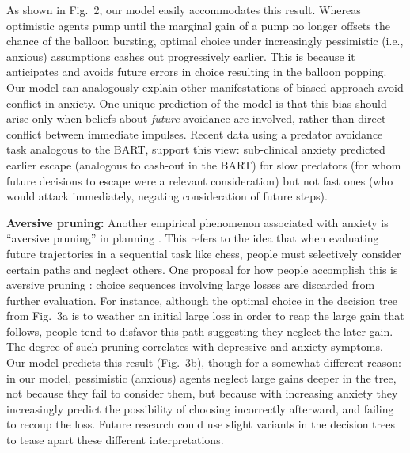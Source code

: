 \documentclass[11pt]{article} %
\begin{document}
As shown in Fig.~2, our model easily accommodates this result. Whereas optimistic agents pump until the marginal gain of a pump no longer offsets the chance of the balloon bursting, optimal choice under increasingly pessimistic (i.e., anxious) assumptions cashes out progressively earlier. This is because it anticipates and avoids future errors in choice resulting in the balloon popping. Our model can analogously explain other manifestations of biased approach-avoid conflict in anxiety\cite{bach2015,Mobbs2019}. One unique prediction of the model is that this bias should arise only when beliefs about \emph{future} avoidance are involved, rather than direct conflict between immediate impulses. Recent data \cite{Mobbs2019} using a predator avoidance task analogous to the BART, support this view: sub-clinical anxiety predicted earlier escape (analogous to cash-out in the BART) for slow predators (for whom future decisions to escape were a relevant consideration) but not fast ones (who would attack immediately, negating consideration of future steps).

\textbf{Aversive pruning:} Another empirical phenomenon associated with anxiety is ``aversive pruning'' in planning \cite{Huys2012, Lally2017}. This refers to the idea that when evaluating future trajectories in a sequential task like chess, people must selectively consider certain paths and neglect others. One proposal for how people accomplish this is aversive pruning \citep{Huys2012}: choice sequences involving large losses are discarded from further evaluation. For instance, although the optimal choice in the decision tree from Fig.~3a is to weather an initial large loss in order to reap the large gain that follows, people tend to disfavor this path suggesting they neglect the later gain. The degree of such pruning correlates with depressive \cite{Huys2012} and anxiety \cite{Lally2017} symptoms. Our model predicts this result (Fig.~3b), though for a somewhat different reason: in our model, pessimistic (anxious) agents neglect large gains deeper in the tree, not because they fail to consider them, but because with increasing anxiety they increasingly predict the possibility of choosing incorrectly afterward, and failing to recoup the loss. Future research could use slight variants in the decision trees to tease apart these different interpretations.
\end{document}
